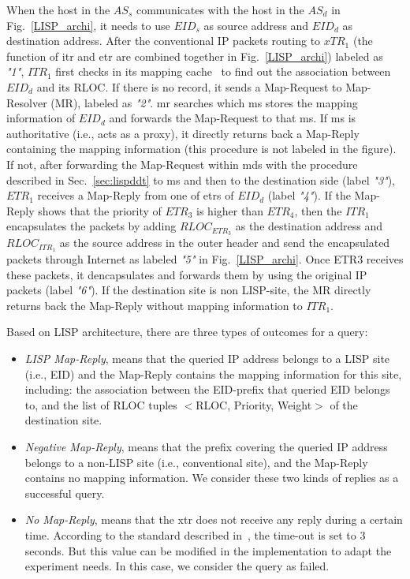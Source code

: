 When the host in the $AS_s$ communicates with the host in the $AS_d$ in Fig.~\ref{LISP_archi}, it needs to use $EID_s$ as source address and $EID_d$ as destination address. After the conventional IP packets routing to $xTR_1$ (the function of \acrshort{itr} and \acrshort{etr} are combined together in Fig.~\ref{LISP_archi}) labeled as \emph{"1"}, $ITR_1$ first checks in its mapping cache~\cite{lispCacheCost} to find out the association between $EID_d$ and its RLOC. If there is no record, it sends a Map-Request to Map-Resolver (MR), labeled as \emph{"2"}. \acrshort{mr} searches which \acrfull{ms} stores the mapping information of $EID_d$ and forwards the Map-Request to that \acrshort{ms}. If \acrshort{ms} is authoritative (i.e., acts as a proxy), it directly returns back a Map-Reply containing the mapping information (this procedure is not labeled in the figure). If not, after forwarding the Map-Request within \acrshort{mds} with the procedure described in Sec.~\ref{sec:lispddt} to \acrshort{ms} and then to the destination side (label \emph{"3"}), $ETR_1$ receives a Map-Reply from one of \acrshort{etr}s of $EID_d$ (label \emph{"4"}). If the Map-Reply shows that the priority of $ETR_3$ is higher than $ETR_4$, then the $ITR_1$ encapsulates the packets by adding $RLOC_{ETR_3}$ as the destination address and $RLOC_{ITR_1}$ as the source address in the outer header and send the encapsulated packets through Internet as labeled \emph{"5"} in Fig.~\ref{LISP_archi}. Once ETR3 receives these packets, it dencapsulates and forwards them by using the original IP packets (label \emph{"6"}). If the destination site is non LISP-site, the MR directly returns back the Map-Reply without mapping information to $ITR_1$.

Based on LISP architecture, there are three types of outcomes for a query:
\begin{itemize}[noitemsep,topsep=0pt]
	\item \emph{LISP Map-Reply}, means that the queried IP address belongs to a LISP site (i.e., EID) and the Map-Reply contains the mapping information for this site, including: the association between the EID-prefix that queried EID belongs to, and the list of RLOC tuples $<$RLOC, Priority, Weight$>$ of the destination site.
	\item \emph{Negative Map-Reply}, means that the prefix covering the queried IP address belongs to a non-LISP site (i.e., conventional site), and the Map-Reply contains no mapping information. We consider these two kinds of replies as a successful query.
    \item \emph{No Map-Reply}, means that the \acrshort{xtr} does not receive any reply during a certain time. According to the standard described in~\cite{rfc6830}, the time-out is set to 3 seconds. But this value can be modified in the implementation to adapt the experiment needs. In this case, we consider the query as failed.
\end{itemize}


